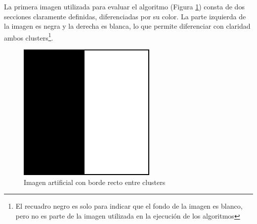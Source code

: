 La primera imagen utilizada para evaluar el algoritmo (Figura \ref{fig:mitad_mitad})  consta de dos secciones claramente definidas, diferenciadas por su color. La parte izquierda de la imagen es negra y la derecha es blanca, lo que permite diferenciar con claridad ambos clusters\footnote{El recuadro negro es solo para indicar que el fondo de la imagen es blanco, pero no es parte de la imagen utilizada en la ejecución de los algoritmos}.


\begin{figure}[H]
\centering
\includegraphics[scale=0.3]{images/mitad_mitad_250x250.png}
\caption{Imagen artificial con borde recto entre clusters}
\label{fig:mitad_mitad}
\end{figure}

